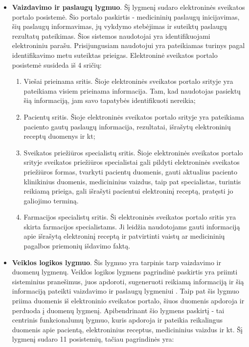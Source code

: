 \begin{itemize}
    \item \textbf{Vaizdavimo ir paslaugų lygmuo}. Šį lygmenį sudaro elektroninės sveikatos portalo posistemė. Šio portalo paskirtis - medicininių  paslaugų inicijavimas, šių paslaugų informavimas, jų vykdymo stebėjimas ir suteiktų paslaugų rezultatų pateikimas\cite{Specifikacija}. Šios sistemos naudotojai yra identifikuojami elektroniniu parašu. Prisijungusiam naudotojui yra pateikiamas turinys pagal identifikavimo metu suteiktas prieigas. Elektroninė sveikatos portalo posistemė susideda iš 4 sričių:
    \begin{enumerate}
        \item Viešai prieinama sritis. Šioje elektroninės sveikatos portalo srityje yra pateikiama visiem prieinama informacija. Tam, kad naudotojas pasiektų šią informaciją, jam savo tapatybės identifikuoti nereikia;
        \item Pacientų sritis. Šioje elektroninės sveikatos portalo srityje yra pateikiama paciento gautų paslaugų informacija, rezultatai, išrašytų elektroninių receptų duomenys ir kt;
        \item Sveikatos priežiūros specialistų sritis. Šioje elektroninės sveikatos portalo srityje sveikatos priežiūros specialistai gali pildyti elektroninės sveikatos priežiūros formas, tvarkyti pacientų duomenis, gauti aktualius paciento klinikinius duomenis, medicininius vaizdus, taip pat specialistas, turintis reikiamą prieiga, gali išrašyti pacientui elektroninį receptą, pratęsti jo galiojimo terminą.
        \item Farmacijos specialistų sritis. Ši elektroninės sveikatos portalo sritis yra skirta farmacijos specialistams. Ji leidžia naudotojams  gauti informaciją apie išrašytą elektroninį receptą ir patvirtinti vaistų ar medicininių pagalbos priemonių išdavimo faktą.
    \end{enumerate}
    \item \textbf{Veiklos logikos lygmuo}. Šis lygmuo yra tarpinis tarp vaizdavimo ir duomenų lygmenų.  Veiklos logikos lygmens pagrindinė paskirtis yra priimti sisteminius pranešimus, juos apdoroti, sugeneruoti reikiamą informaciją ir šią informaciją pateikti vaizdavimo ir paslaugų lygmeniui \cite{Specifikacija}. Taip pat šis lygmuo priima duomenis iš elektroninio sveikatos portalo, šiuos duomenis apdoroja ir perduoda į duomenų lygmenį. Apibendrinant šio lygmens paskirtį - tai centrinis funkcionalumų lygmuo, kuris apdoroja ir pateikia reikalingus duomenis apie pacientą, elektroninius receptus, medicininius vaizdus ir kt. Šį lygmenį sudaro 11 posistemių, tačiau pagrindinės yra: 

\end{itemize}
